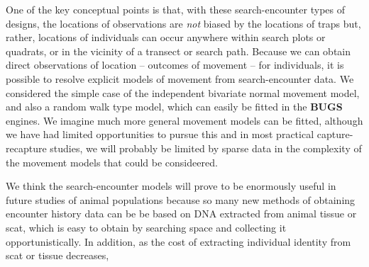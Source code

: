 One of the key conceptual points is that, with these search-encounter
types of designs, the locations of observations are {\it not} biased
by the locations of traps but, rather, locations of individuals can
occur anywhere within search plots or quadrats, or in the vicinity of
a transect or search path.  Because we can obtain direct observations
of location -- outcomes of movement -- for individuals, it is possible
to resolve explicit models of movement from search-encounter data.  We
considered the simple case of the independent bivariate normal
movement model, and also a random walk type model, which can easily be
fitted in the {\bf BUGS} engines.  We imagine much more general
movement models can be fitted, although we have had limited
opportunities to pursue this and in most practical capture-recapture
studies, we will probably be limited by sparse data in the complexity
of the movement models that could be consideered.

We think the search-encounter models will prove to be enormously
useful in future studies of animal populations because so many new
methods of obtaining encounter history data can be be based on DNA
extracted from animal tissue or scat, which is easy to obtain by
searching space and collecting it opportunistically.  In addition, as
the cost of extracting individual identity from scat or tissue
decreases, 
